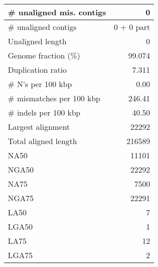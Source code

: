 \documentclass[12pt,a4paper]{article}
\begin{document}
\begin{table}[ht]
\begin{center}
\begin{tabular}{|l*{1}{|r}|}
\# unaligned mis. contigs & 0 \\ \hline
\# unaligned contigs & 0 + 0 part \\ \hline
Unaligned length & 0 \\ \hline
Genome fraction (\%) & 99.074 \\ \hline
Duplication ratio & 7.311 \\ \hline
\# N's per 100 kbp & 0.00 \\ \hline
\# mismatches per 100 kbp & 246.41 \\ \hline
\# indels per 100 kbp & 40.50 \\ \hline
Largest alignment & 22292 \\ \hline
Total aligned length & 216589 \\ \hline
NA50 & 11101 \\ \hline
NGA50 & 22292 \\ \hline
NA75 & 7500 \\ \hline
NGA75 & 22291 \\ \hline
LA50 & 7 \\ \hline
LGA50 & 1 \\ \hline
LA75 & 12 \\ \hline
LGA75 & 2 \\ \hline
\end{tabular}
\end{center}
\end{table}
\end{document}
